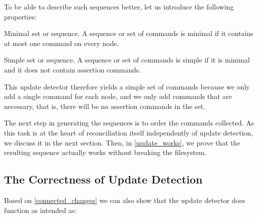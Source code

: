 \documentclass[12pt]{article}
\begin{document}
To be able to describe such sequences better, let us introduce the following properties:

\begin{mydef}{Minimal set or sequence.}
A sequence or set of commands is minimal if it contains at most one command on every node.
\end{mydef}

\begin{mydef}{Simple set or sequence.}
A sequence or set of commands is simple if it is minimal and it does not contain assertion commands.
\end{mydef}

This update detector therefore yields a simple set of commands because we only add a single command
for each node, and we only add commands that are necessary, that is, there will be no 
assertion commands in the set.

The next step in generating the sequences is to order the commands collected.
As this task is at the heart of reconciliation itself independently of update detection,
we discuss it in the next section.
Then, in \cref{update_works}, we prove that the resulting sequence actually
works without breaking the filesystem.




\subsection{The Correctness of Update Detection}

Based on \cref{connected_changes} we can also show that
the update detector does function as intended as:
\end{document}
